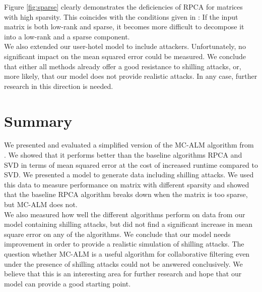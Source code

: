 \documentclass[10pt,conference,compsocconf]{IEEEtran}
\begin{document}
Figure \ref{fig:sparse} clearly demonstrates the deficiencies of RPCA for
matrices with high sparsity. This coincides with the conditions given in
\cite{rpcapaper}: If the input matrix is both low-rank and sparse, it becomes 
more difficult to decompose it into a low-rank and a sparse component.\\

We also extended our user-hotel model to include attackers.
Unfortunately, no significant impact on the mean squared error could be
measured. We conclude that either all methods already offer a good resistance to
shilling attacks, or, more likely, that our model does not provide realistic
attacks. In any case, further research in this direction is needed.

\section{Summary}
We presented and evaluated a simplified version of the MC-ALM algorithm from
\cite{almpaper}. We showed that it performs better than the baseline algorithms
RPCA and SVD in terms of mean squared error at the cost of increased runtime
compared to SVD. We presented a model to generate data including shilling
attacks. We used this data to measure performance on matrix with different
sparsity and showed that the baseline RPCA algorithm breaks down when the matrix
is too sparse, but MC-ALM does not. \\

We also measured how well the different algorithms perform on data from our
model containing shilling attacks, but did not find a significant increase in
mean square error on any of the algorithms. We conclude that our model needs
improvement in order to provide a realistic simulation of shilling attacks. The
question whether MC-ALM is a useful algorithm for collaborative filtering even
under the presence of shilling attacks could not be answered conclusively. We
believe that this is an interesting area for further research and hope that our
model can provide a good starting point.




\end{document}
